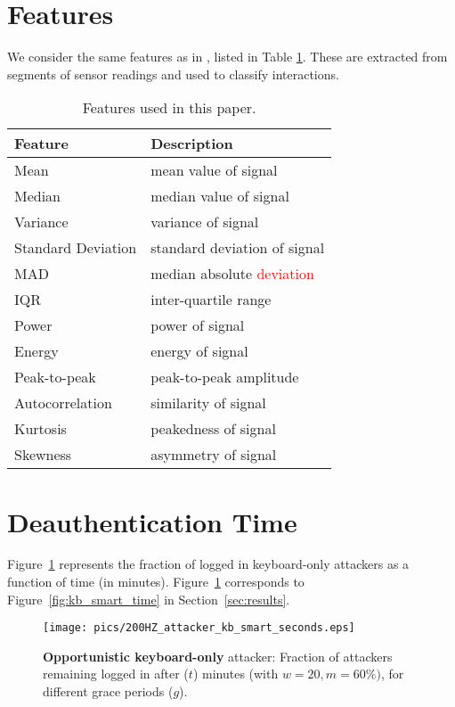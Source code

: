 \documentclass[conference]{IEEEtran}
\newcommand{\KBactivity}{keyboard-only\xspace}
\newif\ifllncs
\newcommand\changeMika[1]{\textcolor{red}{#1}}
\newcommand\changeMika[1]{{#1}}
\begin{document}
\section{Features}
\label{app:features}
We consider the same features as in \cite{mare2014zebra}, listed in Table \ref{tab:features}. These are extracted from segments of sensor readings and used to classify interactions.
\begin{table}[t!]
\centering
	\caption{Features used in this paper.}
	\begin{tabular}{|l|l|}
	\hline
	\textbf{Feature} & \textbf{Description} \\[6pt]
	\hline
	Mean & mean value of signal\\
	\hline
	Median & median value of signal\\
	\hline
	Variance & variance of signal\\	
	\hline
	Standard Deviation & standard deviation of signal\\
	\hline
	MAD & median absolute \changeMika{deviation}\\
	\hline
	IQR & inter-quartile range\\
	\hline
	Power & power of signal\\
	\hline
	Energy & energy of signal\\
	\hline
	Peak-to-peak & peak-to-peak amplitude\\
	\hline
	Autocorrelation & similarity of signal\\
	\hline
	Kurtosis & peakedness of signal\\
	\hline
	Skewness & asymmetry of signal\\
	\hline
	\end{tabular}
	\label{tab:features}
\end{table}

\ifllncs
\section{Deauthentication Time}
\label{app:deauthentication_time}

Figure~\ref{fig:kb_smart_time_sec} represents the fraction of logged
in \KBactivity attackers as a function of time (in minutes). 
Figure~\ref{fig:kb_smart_time_sec} corresponds to Figure~\ref{fig:kb_smart_time} in Section~\ref{sec:results}.

\begin{figure}[h]\centering
  \texttt{[image: pics/200HZ\_attacker\_kb\_smart\_seconds.eps]}
\caption{\textbf{Opportunistic \KBactivity} attacker: 
Fraction of attackers remaining logged in after ($t$) minutes
  (with $w=20, m=60\%)$, for different grace periods ($g$).}
  \label{fig:kb_smart_time_sec}
\end{figure}
\end{document}
